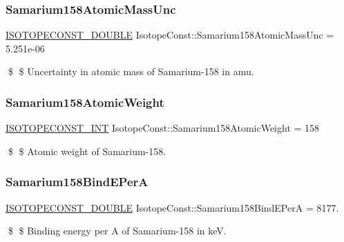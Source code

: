 \subsubsection{\texorpdfstring{Samarium158\+Atomic\+Mass\+Unc}{Samarium158AtomicMassUnc}}
{\footnotesize\ttfamily \mbox{\hyperlink{group___isotope_const-_macros_ga8f45a7272ce02c0b4c65c44636ed719a}{I\+S\+O\+T\+O\+P\+E\+C\+O\+N\+S\+T\+\_\+\+D\+O\+U\+B\+LE}} Isotope\+Const\+::\+Samarium158\+Atomic\+Mass\+Unc = 5.\+251e-\/06}

\$ \$ Uncertainty in atomic mass of Samarium-\/158 in amu. \mbox{\label{group___isotope_const-_samarium-_sm158_ga503e90627eaa535be1b03db143c5b664}} 
\subsubsection{\texorpdfstring{Samarium158\+Atomic\+Weight}{Samarium158AtomicWeight}}
{\footnotesize\ttfamily \mbox{\hyperlink{group___isotope_const-_macros_ga5f18360b3e99483a35c32d789e62621c}{I\+S\+O\+T\+O\+P\+E\+C\+O\+N\+S\+T\+\_\+\+I\+NT}} Isotope\+Const\+::\+Samarium158\+Atomic\+Weight = 158}

\$ \$ Atomic weight of Samarium-\/158. \mbox{\label{group___isotope_const-_samarium-_sm158_gab9d4c027e47e63f5ba3208f109a30181}} 
\subsubsection{\texorpdfstring{Samarium158\+Bind\+E\+PerA}{Samarium158BindEPerA}}
{\footnotesize\ttfamily \mbox{\hyperlink{group___isotope_const-_macros_ga8f45a7272ce02c0b4c65c44636ed719a}{I\+S\+O\+T\+O\+P\+E\+C\+O\+N\+S\+T\+\_\+\+D\+O\+U\+B\+LE}} Isotope\+Const\+::\+Samarium158\+Bind\+E\+PerA = 8177.}

\$ \$ Binding energy per A of Samarium-\/158 in keV. \mbox{\label{group___isotope_const-_samarium-_sm158_gae53db4a4b48d9e4a70ffb49257021b28}} 
